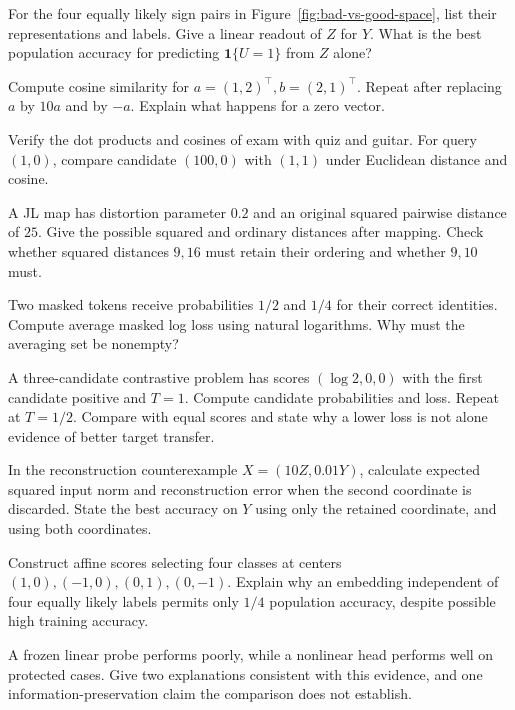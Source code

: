 \begin{exercises}
\item {}For the four equally likely sign pairs in Figure~\ref{fig:bad-vs-good-space}, list their representations and labels. Give a linear readout of $Z$ for $Y$. What is the best population accuracy for predicting $\mathbf1\{U=1\}$ from $Z$ alone?
\item {}Compute cosine similarity for $a=(1,2)^\top,b=(2,1)^\top$. Repeat after replacing $a$ by $10a$ and by $-a$. Explain what happens for a zero vector.
\item {}Verify the dot products and cosines of exam with quiz and guitar. For query $(1,0)$, compare candidate $(100,0)$ with $(1,1)$ under Euclidean distance and cosine.
\item {}A JL map has distortion parameter $0.2$ and an original squared pairwise distance of $25$. Give the possible squared and ordinary distances after mapping. Check whether squared distances $9,16$ must retain their ordering and whether $9,10$ must.
\item {}Two masked tokens receive probabilities $1/2$ and $1/4$ for their correct identities. Compute average masked log loss using natural logarithms. Why must the averaging set be nonempty?
\item {}A three-candidate contrastive problem has scores $(\log2,0,0)$ with the first candidate positive and $T=1$. Compute candidate probabilities and loss. Repeat at $T=1/2$. Compare with equal scores and state why a lower loss is not alone evidence of better target transfer.
\item {}In the reconstruction counterexample $X=(10Z,0.01Y)$, calculate expected squared input norm and reconstruction error when the second coordinate is discarded. State the best accuracy on $Y$ using only the retained coordinate, and using both coordinates.
\item {}Construct affine scores selecting four classes at centers $(1,0),(-1,0),(0,1),(0,-1)$. Explain why an embedding independent of four equally likely labels permits only $1/4$ population accuracy, despite possible high training accuracy.
\item {}A frozen linear probe performs poorly, while a nonlinear head performs well on protected cases. Give two explanations consistent with this evidence, and one information-preservation claim the comparison does not establish.

\end{exercises}
